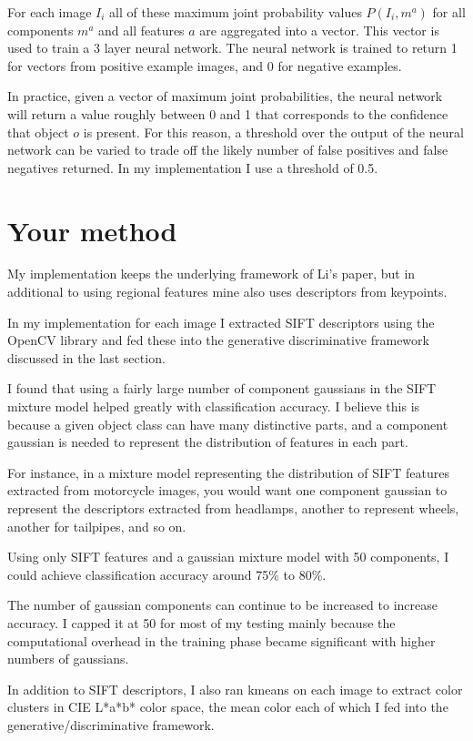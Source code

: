 \documentclass[11pt]{article}
\begin{document}
For each image $I_i$ all of these maximum joint probability values
$P(I_i, m^a)$ for all components $m^a$ and all features $a$ are
aggregated into a vector. This vector is used to train a 3 layer
neural network. The neural network is trained to return 1 for vectors
from positive example images, and 0 for negative examples.

In practice, given a vector of maximum joint probabilities, the neural
network will return a value roughly between 0 and 1 that corresponds
to the confidence that object $o$ is present. For this reason, a
threshold over the output of the neural network can be varied to trade
off the likely number of false positives and false negatives
returned. In my implementation I use a threshold of 0.5.

\section{Your method}

My implementation keeps the underlying framework of Li's paper, but in
additional to using regional features mine also uses descriptors from
keypoints.

In my implementation for each image I extracted SIFT\cite{sift}
descriptors using the OpenCV library and fed these into the generative
discriminative framework discussed in the last section.

I found that using a fairly large number of component gaussians in the
SIFT mixture model helped greatly with classification accuracy. I
believe this is because a given object class can have many distinctive
parts, and a component gaussian is needed to represent the
distribution of features in each part.

For instance, in a mixture model representing the distribution of SIFT
features extracted from motorcycle images, you would want one
component gaussian to represent the descriptors extracted from
headlamps, another to represent wheels, another for tailpipes, and so
on.

Using only SIFT features and a gaussian mixture model with 50
components, I could achieve classification accuracy around 75\% to
80\%.

The number of gaussian components can continue to be increased to
increase accuracy. I capped it at 50 for most of my testing mainly
because the computational overhead in the training phase became
significant with higher numbers of gaussians.

In addition to SIFT descriptors, I also ran kmeans on each image to
extract color clusters in CIE L*a*b* color space, the mean color each
of which I fed into the generative/discriminative framework.
\end{document}
